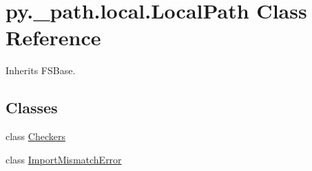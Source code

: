 \hypertarget{classpy_1_1__path_1_1local_1_1_local_path}{}\section{py.\+\_\+path.\+local.\+Local\+Path Class Reference}
\label{classpy_1_1__path_1_1local_1_1_local_path}


Inherits F\+S\+Base.

\subsection*{Classes}
\begin{DoxyCompactItemize}
\item 
class \hyperlink{classpy_1_1__path_1_1local_1_1_local_path_1_1_checkers}{Checkers}
\item 
class \hyperlink{classpy_1_1__path_1_1local_1_1_local_path_1_1_import_mismatch_error}{Import\+Mismatch\+Error}
\end{DoxyCompactItemize}
